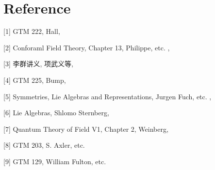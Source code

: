 \documentclass[10pt]{article}
\begin{document}
\clearpage

\section*{Reference}

[1] GTM 222, Hall,

[2] Conforaml Field Theory, Chapter 13, Philippe, etc. ,

[3] 李群讲义, 项武义等, 

[4] GTM 225, Bump,

[5] Symmetries, Lie Algebras and Representations, Jurgen Fuch, etc. ,

[6] Lie Algebras, Shlomo Sternberg,

[7] Quantum Theory of Field V1, Chapter 2, Weinberg,

[8] GTM 203, S. Axler, etc.

[9] GTM 129, William Fulton, etc.
\end{document}
